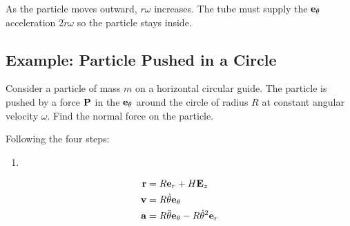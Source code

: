 \documentclass[
  letterpaper,
  DIV=11,
  numbers=noendperiod]{scrreprt}
\providecommand{\tightlist}{%
  \setlength{\itemsep}{0pt}\setlength{\parskip}{0pt}}
\begin{document}
\begin{tcolorbox}[enhanced jigsaw, arc=.35mm, bottomrule=.15mm, bottomtitle=1mm, breakable, colback=white, colbacktitle=quarto-callout-note-color!10!white, colframe=quarto-callout-note-color-frame, coltitle=black, left=2mm, leftrule=.75mm, opacityback=0, opacitybacktitle=0.6, rightrule=.15mm, title=\textcolor{quarto-callout-note-color}{\faInfo}\hspace{0.5em}{Coriolis acceleration}, titlerule=0mm, toprule=.15mm, toptitle=1mm]

As the particle moves outward, \(r\omega\) increases. The tube must
supply the \({\bf e}_\theta\) acceleration \(2\dot{r}\omega\) so the
particle stays inside.

\end{tcolorbox}

\subsection{Example: Particle Pushed in a
Circle}\label{example-particle-pushed-in-a-circle}

Consider a particle of mass \(m\) on a horizontal circular guide. The
particle is pushed by a force \({\bf P}\) in the \({\bf e}_\theta\)
around the circle of radius \(R\) at constant angular velocity
\(\omega\). Find the normal force on the particle.

Following the four steps:

\begin{enumerate}
\def\labelenumi{\arabic{enumi}.}
\tightlist
\item
\end{enumerate}

\begin{align*}
    {\bf r} &= R{\bf e}_r+H{\bf E}_z\\
    {\bf v} &= R\dot{\theta}{\bf e}_\theta\\
    {\bf a} &= R\ddot{\theta}{\bf e}_\theta-R\dot{\theta}^2{\bf e}_r
\end{align*}
\end{document}

